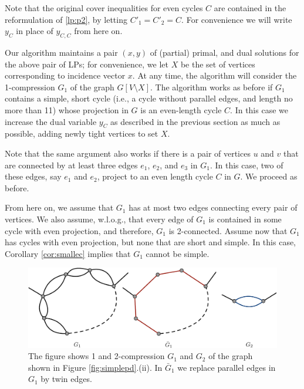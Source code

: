\documentclass{article}
\newcommand{\0}{\mathbb{0}}
\newcommand{\1}{\mathbb{1}}
\begin{document}
Note that the original cover inequalities for even cycles 
$C$ are contained in the reformulation of \eqref{lp:p2}, by
letting $C'_1=C'_2=C$. For convenience we will write
$y_C$ in place of $y_{C,C}$ from here on. 

Our algorithm maintains a pair $(x,y)$ of (partial) primal,
and dual solutions for the above pair of LPs; for convenience, we let $X$ be the set of vertices
corresponding to incidence vector $x$. 
At any time, the algorithm will consider the 1-compression $G_1$
of the graph $G[V\setminus X]$. The algorithm works as before if $G_1$
contains a simple, short cycle (i.e., a cycle without parallel edges, and length no more
than 11) whose
projection in $G$ is an even-length cycle $C$. In this case we
increase the dual variable $y_{C}$ as described in the previous
section as much as possible, adding newly tight vertices to set $X$. 

Note that the same argument also works if there is a pair of vertices $u$ and $v$ that are connected
by at least three edges $e_1$, $e_2$, and $e_3$ in $G_1$. In this case, two of these edges, say
$e_1$ and $e_2$, project to an even length cycle $C$ in $G$. We proceed as before.

From here on, we assume that $G_1$ has at most two edges connecting every pair of vertices. 
We also assume, w.l.o.g., that every edge of $G_1$ is contained in some cycle with even projection,
and therefore, $G_1$ is 2-connected. Assume now that $G_1$ has cycles with even projection, but none
that are short and simple. In this case, Corollary \ref{cor:smallec} implies that $G_1$
cannot be simple. 

\begin{figure}[ht]
  \begin{center}
    \includegraphics[width=.85\textwidth]{2compress.pdf}
  \end{center}
  \caption{\label{fig:2compress} The figure shows 1 and 2-compression
    $G_1$ and $G_2$ of the graph shown in Figure \ref{fig:simplepd}.(ii). In $\bar{G}_1$ we replace parallel
    edges in $G_1$ by twin edges. }
\end{figure}
\end{document}
